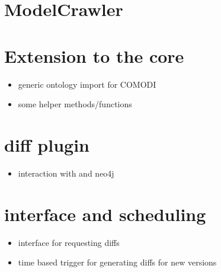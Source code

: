 
\section{ModelCrawler}
	\todo[to be decided]

\section{Extension to the \masymos core}
	\begin{itemize}
		\item generic ontology import for COMODI
		\item some helper methods/functions
	\end{itemize}

\section{\masymos diff plugin}
	\begin{itemize}
		\item interaction with \bives and neo4j
	\end{itemize}

\section{\rest interface and scheduling}
	\begin{itemize}
		\item \rest interface for requesting diffs
		\item time based trigger for generating diffs for new versions
	\end{itemize}

